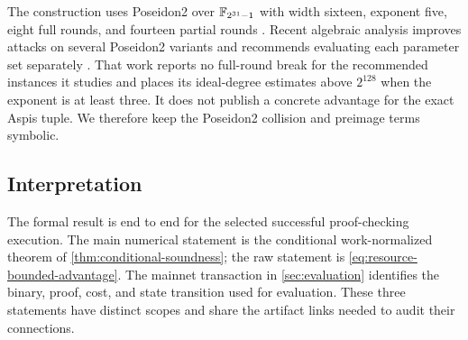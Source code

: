 The construction uses Poseidon2 over \(\mathbb{F}_{2^{31}-1}\) with width sixteen, exponent five,
eight full rounds, and fourteen partial rounds
\cite{GrassiKhovratovichSchofnegger2023Poseidon2}.  Recent algebraic analysis
improves attacks on several Poseidon2 variants and recommends evaluating each
parameter set separately \cite{MerzRodriguezGarcia2026Poseidon2}.  That work
reports no full-round break for the recommended instances it studies and
places its ideal-degree estimates above \(2^{128}\) when the exponent is at
least three.  It does not publish a concrete advantage for the exact Aspis
tuple.  We therefore keep the Poseidon2 collision and preimage terms symbolic.

\subsection{Interpretation}

The formal result is end to end for the selected successful proof-checking
execution.  The main numerical statement is the conditional work-normalized
theorem of \cref{thm:conditional-soundness}; the raw statement is
\cref{eq:resource-bounded-advantage}.  The mainnet transaction in
\cref{sec:evaluation} identifies the binary, proof, cost, and state transition
used for evaluation.  These three statements have distinct scopes and share
the artifact links needed to audit their connections.
